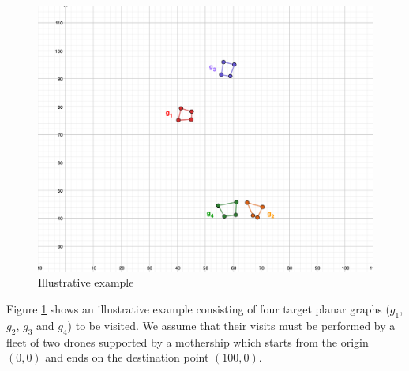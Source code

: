 \noindent



\begin{figure}[h]
\centering
\includegraphics[width = 0.5\linewidth]{figures/example.png}
\caption{Illustrative example \label{fig:example1}}
\end{figure}

\noindent
Figure \ref{fig:example1} shows an illustrative example consisting of four target planar graphs ($g_1$, $g_2$, $g_3$ and $g_4$) to be visited. We assume that their visits must be performed by a fleet of two drones supported by a mothership which starts from the origin $(0,0)$ and ends on the destination point $(100,0)$.



